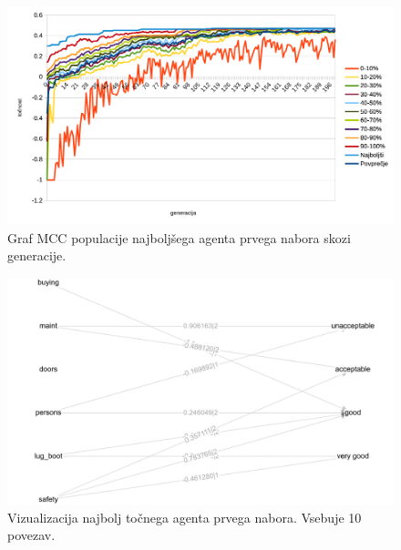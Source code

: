\begin{figure}[H]
    \begin{center}
        \includegraphics[width=13cm]{car/1/mcc}
    \end{center}
    \caption{Graf MCC populacije najboljšega agenta prvega nabora skozi generacije.}
    \label{fig:car_mcc_1}
\end{figure}

\begin{figure}[H]
    \begin{center}
        \includegraphics[width=13cm]{car/1/acc_g}
    \end{center}
    \caption{Vizualizacija najbolj točnega agenta prvega nabora. Vsebuje 10 povezav.}
    \label{fig:car_acc_1_g}
\end{figure}

